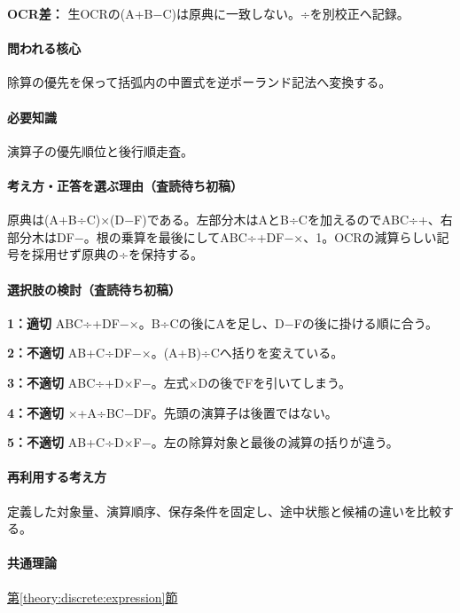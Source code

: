 \noindent\textbf{OCR差：} 生OCRの(A+B−C)は原典に一致しない。÷を別校正へ記録。\par

\paragraph{問われる核心} 除算の優先を保って括弧内の中置式を逆ポーランド記法へ変換する。

\paragraph{必要知識} 演算子の優先順位と後行順走査。

\paragraph{考え方・正答を選ぶ理由（査読待ち初稿）} 原典は(A+B÷C)×(D−F)である。左部分木はAとB÷Cを加えるのでABC÷+、右部分木はDF−。根の乗算を最後にしてABC÷+DF−×、1。OCRの減算らしい記号を採用せず原典の÷を保持する。

\paragraph{選択肢の検討（査読待ち初稿）}\mbox{}\par

\noindent\textbf{1：適切} ABC÷+DF−×。B÷Cの後にAを足し、D−Fの後に掛ける順に合う。\par

\noindent\textbf{2：不適切} AB+C÷DF−×。(A+B)÷Cへ括りを変えている。\par

\noindent\textbf{3：不適切} ABC÷+D×F−。左式×Dの後でFを引いてしまう。\par

\noindent\textbf{4：不適切} ×+A÷BC−DF。先頭の演算子は後置ではない。\par

\noindent\textbf{5：不適切} AB+C÷D×F−。左の除算対象と最後の減算の括りが違う。\par

\paragraph{再利用する考え方} 定義した対象量、演算順序、保存条件を固定し、途中状態と候補の違いを比較する。

\paragraph{共通理論} \hyperref[theory:discrete:expression]{第\ref*{theory:discrete:expression}節}

